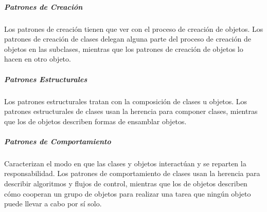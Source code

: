 \subparagraph{Patrones de Creación}
Los patrones de creación tienen que ver con el proceso de creación de objetos. Los patrones de creación de clases delegan alguna parte del proceso de creación de objetos en las subclases, mientras que los patrones de creación de objetos lo hacen en otro objeto. 
\subparagraph{Patrones Estructurales}
Los patrones estructurales tratan con la composición de clases u objetos. Los patrones estructurales de clases usan la herencia para componer clases, mientras que los de objetos describen formas de ensamblar objetos.
\subparagraph{Patrones de Comportamiento}
Caracterizan el modo en que las clases y objetos interactúan y se reparten la responsabilidad. Los patrones de comportamiento de clases usan la herencia para describir algoritmos y flujos de control, mientras que los de objetos describen cómo cooperan un grupo de objetos para realizar una tarea que ningún objeto puede llevar a cabo por sí solo.
